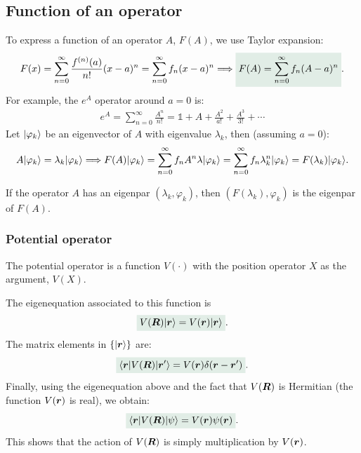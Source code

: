 \subsection{Function of an operator}
To express a function of an operator $A$, $F(A)$, we use Taylor expansion:
\begin{align}
    F(x)=\sum_{n=0}^\infty\frac{f^{(n)}(a)}{n!}(x-a)^n=\sum_{n=0}^\infty f_n(x-a)^n\Longrightarrow\highlight{F(A)=\sum_{n=0}^\infty f_n(A-a)^n}.
\end{align}
For example, the $e^A$ operator around $a=0$ is:
\begin{align*}
    e^A=\sum_{n=0}^\infty\frac{A^n}{n!}=\mathds{1}+A+\frac{A^2}{a!}+\frac{A^3}{3!}+\cdots
\end{align*}
Let $|\varphi_k\rangle$ be an eigenvector of $A$ with eigenvalue $\lambda_k$, then (assuming $a=0$):
\begin{align*}
    A|\varphi_k\rangle=\lambda_k|\varphi_k\rangle\Longrightarrow F(A)|\varphi_k\rangle=\sum_{n=0}^\infty f_nA^n\lambda|\varphi_k\rangle=\sum_{n=0}^\infty f_n\lambda^n_k|\varphi_k\rangle=F(\lambda_k)|\varphi_k\rangle.  
\end{align*}
\begin{emphasizer}
    If the operator $A$ has an eigenpar $(\lambda_k,\varphi_k)$, then $(F(\lambda_k),\varphi_k)$ is the eigenpar of $F(A)$.
\end{emphasizer}

\subsubsection{Potential operator}
The potential operator is a function $V(\cdot)$ with the position operator $X$ as the argument, $V(X)$. 

The eigenequation associated to this function is
\begin{align}
    \highlight{V(\BR)\ket{\bR}=V(\bR)\ket{\bR}}.
\end{align} 
The matrix elements in $\{|\bm{r}\rangle\}$ are:
\begin{align}
    \highlight{\braket{\bR|V(\BR)|\bR'}=V(\bR)\delta(\bR-\bR')}.
\end{align}
Finally, using the eigenequation above and the fact that $V(\bm{R})$ is Hermitian (the function $V(\bm{r})$ is real), we obtain:
\begin{align}
    \highlight{\braket{\bR|V(\BR)|\psi}=V(\bR)\psi(\bR)}.
\end{align}
This shows that the action of $V(\bm{R})$ is simply multiplication by $V(\bm{r})$.
